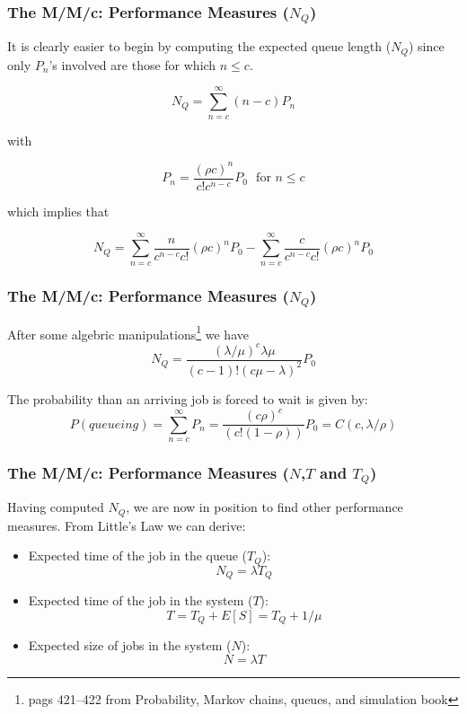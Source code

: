 \begin{frame}
    \frametitle{The M/M/c: Performance Measures ($N_Q$)}

        It is clearly easier to begin by computing the expected queue length ($N_Q$) since only $P_n$'s involved
        are those for which $n\leq c$.

        $$N_Q = \sum_{n=c}^{\infty}(n-c)P_n$$

        with 

        $$P_n = \frac{(\rho c)^n}{c!c^{n-c}}P_0~~~\text{for $n\leq c$}$$

        which implies that

        $$N_Q = \sum_{n=c}^{\infty} \frac{n}{c^{n-c}c!}(\rho c)^{n}P_0 - \sum_{n=c}^{\infty} \frac{c}{c^{n-c}c!}(\rho c)^{n}P_0$$

\end{frame}


\begin{frame}
    \frametitle{The M/M/c: Performance Measures ($N_Q$)}

    After some algebric manipulations\footnote{pags 421--422 from Probability, Markov chains, queues, and 
    simulation book} we have
    $$N_Q = \frac{(\lambda/\mu)^c\lambda\mu}{(c-1)!(c\mu - \lambda)^2}P_0$$

    The probability than an arriving job is forced to wait is given by:
    $$P(queueing) = \sum_{n=c}^{\infty}P_n = \frac{(c\rho)^c}{(c!(1-\rho))}P_0 = C(c,\lambda/\rho)$$
\end{frame}


\begin{frame}
    \frametitle{The M/M/c: Performance Measures ($N$,$T$ and $T_Q$)}

    Having computed $N_Q$, we are now in position to find other performance measures.
    From Little's Law we can derive:

    \begin{itemize}
        \item Expected time of the job in the queue ($T_Q$):
        $$N_Q = \lambda T_Q$$
        \item Expected time of the job in the system ($T$):
        $$T = T_Q + E[S] = T_Q + 1/\mu$$
        \item Expected size of jobs in the system ($N$):
        $$N = \lambda T$$
    \end{itemize}
\end{frame}



